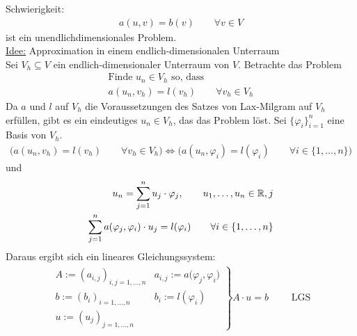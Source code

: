 Schwierigkeit:
\begin{align*}
a(u,v)=b(v)\qquad\forall v\in V
\end{align*}
ist ein unendlichdimensionales Problem.\\
\underline{Idee:} Approximation in einem endlich-dimensionalen Unterraum\\
Sei $V_h\subseteq V$ ein endlich-dimensionaler Unterraum von $V$. Betrachte das Problem
\begin{align*}
\text{Finde }u_n\in V_h \text{ so, dass }\qquad \\
a(u_n,v_h)=l(v_h)\qquad\forall v_h\in V_h
\end{align*}
Da $a$ und $l$ auf $V_h$ die Voraussetzungen des Satzes von Lax-Milgram auf $V_h$ erfüllen, gibt es ein eindeutiges $u_n\in V_h$, das das Problem löst.\nl
Sei $\lbrace\varphi_i\rbrace_{i=1}^n$ eine Basis von $V_h$.
\begin{align*}
\Big(a(u_n,v_h)=l(v_h)\qquad\forall v_h\in V_h\Big)\Longleftrightarrow
\Big(a(u_n,\varphi_i)=l(\varphi_i)\qquad\forall i\in\lbrace1,\ldots,n\rbrace\Big)
\end{align*}
und 
\begin{align*}
u_n=\sum\limits_{j=1}^n u_j\cdot\varphi_j,\qquad u_1,\ldots,u_n\in\mathbb{R},j\\
\sum\limits_{j=1}^n a(\varphi_j,\varphi_i)\cdot u_j=l(\varphi_i)\qquad\forall i\in\lbrace1,\ldots,n\rbrace\\
\end{align*}
Daraus ergibt sich ein lineares Gleichungssystem:
\begin{align*}
\left.\begin{array}{ll}
A:=(a_{i,j})_{i,j=1,\ldots,n} &a_{i,j}:=a\big(\varphi_j,\varphi_i\big)\\
b:=(b_i)_{i=1,\ldots,n} &b_i:=l(\varphi_i)\\
u:=(u_j)_{j=1,\ldots,n}
\end{array}\right\rbrace A\cdot u=b\qquad\text{ LGS}
\end{align*}

